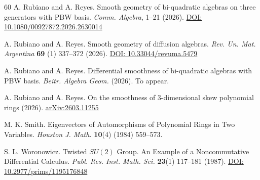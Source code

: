 \documentclass{amsart}
\theoremstyle{definition}
\theoremstyle{remark}
\numberwithin{equation}{section}
\begin{document}
\begin{thebibliography}{60}
 A. Rubiano and A. Reyes. Smooth geometry of bi-quadratic algebras on three generators with PBW basis. {\em Comm. Algebra}, 1--21 (2026). \href{https://doi.org/10.1080/00927872.2026.2630014}{DOI: 10.1080/00927872.2026.2630014}

 A. Rubiano and A. Reyes. Smooth geometry of diffusion algebras. {\em Rev. Un. Mat. Argentina} {\bf 69} (1) 337--372 (2026). \href{ https://doi.org/10.33044/revuma.5479}{DOI: 10.33044/revuma.5479}

 A. Rubiano and A. Reyes. Differential smoothness of bi-quadratic algebras with PBW basis. {\em Beitr. Algebra Geom.} (2026). To appear.

 A. Rubiano and A. Reyes. On the smoothness of 3-dimensional skew polynomial rings (2026). \href{https://arxiv.org/abs/2603.11255}{arXiv:2603.11255}


 M. K. Smith. Eigenvectors of Automorphisms of Polynomial Rings in Two Variables. {\em Houston J. Math.} {\bf 10}(4) (1984) 559--573.


 S. L. Woronowicz. Twisted $SU(2)$ {G}roup. An {E}xample of a {N}oncommutative {D}ifferential {C}alculus. {\em Publ. Res. Inst. Math. Sci.} {\bf 23}(1) 117--181 (1987). \href{https://doi.org/10.2977/prims/1195176848}{DOI: 10.2977/prims/1195176848}


\end{thebibliography}
\end{document}

